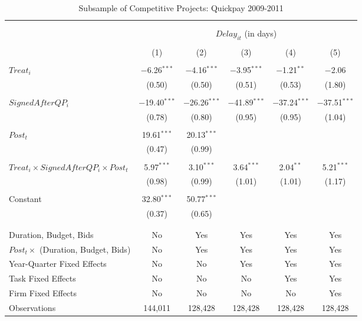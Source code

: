 \documentclass[
]{article}
\begin{document}
\begin{table}[H] \centering 
  \caption{Subsample of Competitive Projects: Quickpay 2009-2011} 
  \label{} 
\small 
\begin{tabular}{@{\extracolsep{-2pt}}lccccc} 
\\[-1.8ex]\hline 
\hline \\[-1.8ex] 
\\[-1.8ex] & \multicolumn{5}{c}{$Delay_{it}$ (in days)} \\ 
\\[-1.8ex] & (1) & (2) & (3) & (4) & (5)\\ 
\hline \\[-1.8ex] 
 $Treat_i$ & $-$6.26$^{***}$ & $-$4.16$^{***}$ & $-$3.95$^{***}$ & $-$1.21$^{**}$ & $-$2.06 \\ 
  & (0.50) & (0.50) & (0.51) & (0.53) & (1.80) \\ 
  & & & & & \\ 
 $SignedAfterQP_i$ & $-$19.40$^{***}$ & $-$26.26$^{***}$ & $-$41.89$^{***}$ & $-$37.24$^{***}$ & $-$37.51$^{***}$ \\ 
  & (0.78) & (0.80) & (0.95) & (0.95) & (1.04) \\ 
  & & & & & \\ 
 $Post_t$ & 19.61$^{***}$ & 20.13$^{***}$ &  &  &  \\ 
  & (0.47) & (0.99) &  &  &  \\ 
  & & & & & \\ 
 $Treat_i \times SignedAfterQP_i \times Post_t$ & 5.97$^{***}$ & 3.10$^{***}$ & 3.64$^{***}$ & 2.04$^{**}$ & 5.21$^{***}$ \\ 
  & (0.98) & (0.99) & (1.01) & (1.01) & (1.17) \\ 
  & & & & & \\ 
 Constant & 32.80$^{***}$ & 50.77$^{***}$ &  &  &  \\ 
  & (0.37) & (0.65) &  &  &  \\ 
  & & & & & \\ 
\hline \\[-1.8ex] 
Duration, Budget, Bids & No & Yes & Yes & Yes & Yes \\ 
$Post_t \times $  (Duration, Budget, Bids) & No & Yes & Yes & Yes & Yes \\ 
Year-Quarter Fixed Effects & No & No & Yes & Yes & Yes \\ 
Task Fixed Effects & No & No & No & Yes & Yes \\ 
Firm Fixed Effects & No & No & No & No & Yes \\ 
Observations & 144,011 & 128,428 & 128,428 & 128,428 & 128,428 \\ 

\end{tabular}
\end{table}
\end{document}
